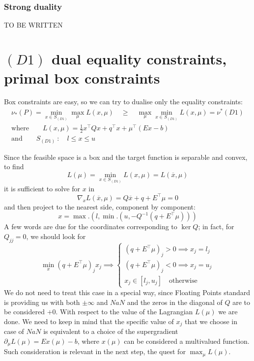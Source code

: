 \documentclass[twoside]{mfitjournal}
\begin{document}
\subsubsection*{Strong duality}
TO BE WRITTEN

\section*{$(D1)$ dual equality constraints, primal box constraints}
Box constraints are easy, so we can try to dualise only the equality constraints:
\begin{gather*}
    \nu_*(P) = \min_{x \in S_{(D1)}} \max_{\mu} L(x, \mu) \quad\ge\quad \max_{\mu} \min_{x \in S_{(D1)}} L(x, \mu) = \nu^*(D1)  \\
   \textrm{where}\qquad  L(x, \mu) = \frac{1}{2} x^\intercal Q x + q^\intercal x + \mu^\intercal (E x - b)  \\
    \textrm{and}\qquad  S_{(D1)} \: :\quad l \le x \le u 
\end{gather*}

Since the feasible space is a box and the target function is separable and convex, to find 
\[
    L(\mu) = \min_{x \in S_{(D1)}} L(x, \mu) = L(\overline{x}, \mu)
\]
it is sufficient to solve for $x$ in 
\[
    \nabla_x L(\overbar{x}, \mu) = Q \overbar{x} + q + E^\intercal\mu = 0
\]
and then project to the nearest side, component by component:
\[
    x = \max.(l, \min.(u, -Q^{-1}(q + E^\intercal\mu)))
\]
A few words are due for the coordinates corresponding to $\ker Q$; in fact, for $Q_{j j} = 0$, we should look for 
\[
    \min_x (q + E^\intercal \mu)_j x_j \implies \begin{cases}
        (q + E^\intercal \mu)_j > 0 \implies x_j = l_j \\
        (q + E^\intercal \mu)_j < 0 \implies x_j = u_j \\
        x_j \in [l_j, u_j] \quad \textrm{otherwise}
    \end{cases}
\]
We do not need to treat this case in a special way, since Floating Points standard is providing us with both $\pm\infty$ and $NaN$ and the zeros in the diagonal of $Q$ are to be considered $+0$. With respect to the value of the Lagrangian $L(\mu)$ we are done.
We need to keep in mind that the specific value of $x_j$ that we choose in case of $NaN$ is equivalent to a choice of the supergradient $\partial_\mu L(\mu) = E x(\mu) - b$, where $x(\mu)$ can be considered a multivalued function. Such consideration is relevant in the next step, the quest for $\max_\mu L(\mu)$.
\end{document}
